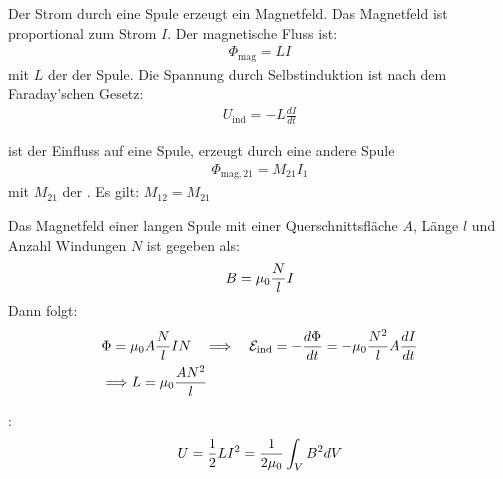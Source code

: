 
Der Strom durch eine Spule erzeugt ein Magnetfeld. Das Magnetfeld ist proportional zum Strom $I$.
Der magnetische Fluss ist:
\begin{align*}
    \Phi_{\text{mag}} = L I
\end{align*}
mit $L$ der  der Spule. Die Spannung durch Selbstinduktion
ist nach dem Faraday'schen Gesetz:
\begin{align*}
    U_{\text{ind}} = -L \frac{dI}{dt}
\end{align*}

\vspace{1\baselineskip}

ist der Einfluss auf eine Spule, erzeugt durch eine andere Spule
\begin{align*}
    \Phi_{\text{mag},21} = M_{21} I_1
\end{align*}
mit $M_{21}$ der . Es gilt: $M_{12} = M_{21}$

\vspace{1\baselineskip}

Das Magnetfeld einer langen Spule mit einer Querschnittsfläche $A$, Länge $l$ und
Anzahl Windungen $N$ ist gegeben als:
\begin{align*}
    B = \mu_0 \frac{N}{l} I
\end{align*}
Dann folgt:
\begin{align*}
    &\Phi = \mu_0 A \frac{N}{l} I N
    \quad \Longrightarrow \quad
    \mathcal{E}_{\text{ind}} = - \frac{d \Phi}{dt} = - \mu_0 \frac{N^2}{l} A \frac{dI}{dt}
    \\
    &\Longrightarrow L = \mu_0 \frac{A N^2}{l}
\end{align*}

\vspace{1\baselineskip}

:
\begin{align*}
    U = \frac{1}{2} L I^2 = \frac{1}{2 \mu_0} \int_V B^2 dV
\end{align*}
